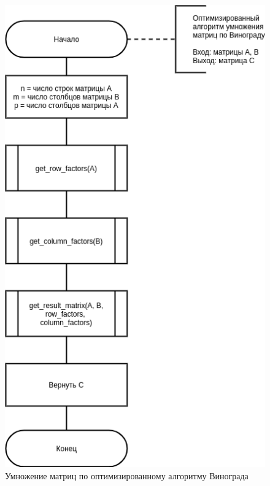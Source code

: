 \begin{figure}[H]
	\begin{center}
		\includegraphics[scale=0.7]{img/optimized_winograd.png}
	\end{center}
	\captionsetup{justification=centering}
	\caption{Умножение матриц по оптимизированному алгоритму Винограда}
	\label{img:optimized}
\end{figure}

